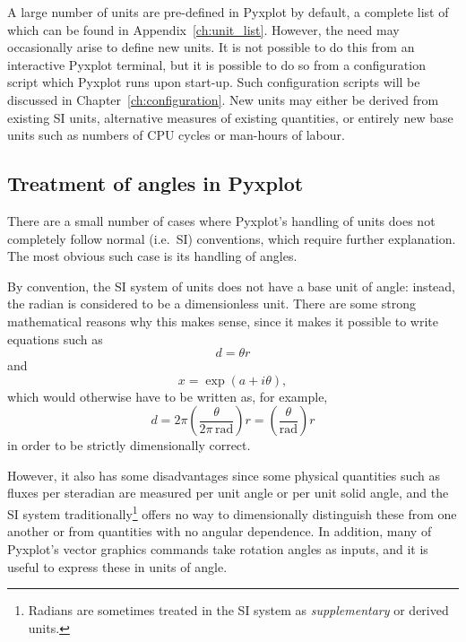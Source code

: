A large number of units are pre-defined in Pyxplot by default, a complete list
of which can be found in Appendix~\ref{ch:unit_list}.  However, the need may
occasionally arise to define new units. It is not possible to do this from an
interactive Pyxplot terminal, but it is possible to do so from a configuration
script which Pyxplot runs upon start-up. Such configuration scripts will be
discussed in Chapter~\ref{ch:configuration}. New units may either be derived
from existing SI units, alternative measures of existing quantities, or
entirely new base units such as numbers of CPU cycles or man-hours of labour.

\subsection{Treatment of angles in Pyxplot}
\label{sec:angles}

There are a small number of cases where Pyxplot's handling of units does not
completely follow normal (i.e.\ SI) conventions, which require further
explanation. The most obvious such case is its handling of angles.

By convention, the SI system of units does not have a base unit of angle:
instead, the radian is considered to be a dimensionless unit.  There are some
strong mathematical reasons why this makes sense, since it makes it possible to
write equations such as
\begin{displaymath}
d=\theta r
\end{displaymath}
and
\begin{displaymath}
x = \exp(a+i\theta),
\end{displaymath}
which would otherwise have to be written as, for example,
\begin{displaymath}
d=2\pi\left(\frac{\theta}{2\pi\,\mathrm{rad}}\right) r=\left(\frac{\theta}{\mathrm{rad}}\right) r
\end{displaymath}
in order to be strictly dimensionally correct.

However, it also has some disadvantages since some physical quantities such as
fluxes per steradian are measured per unit angle or per unit solid angle, and
the SI system traditionally\footnote{Radians are sometimes treated in the SI
system as {\it supplementary} or derived units.} offers no way to dimensionally
distinguish these from one another or from quantities with no angular
dependence.  In addition, many of Pyxplot's vector graphics commands take
rotation angles as inputs, and it is useful to express these in units of angle.

